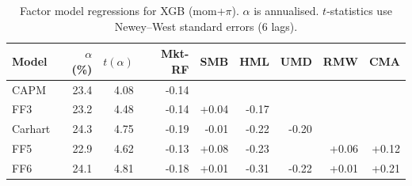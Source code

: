 \begin{table}[H]
\centering
\small
\begin{tabular}{l r r r r r r r r}
\toprule
Model & $\alpha$ (\%) & $t(\alpha)$ & Mkt-RF & SMB & HML & UMD & RMW & CMA \\
\midrule
CAPM & 23.4 & 4.08 & -0.14 &  &  &  &  &  \\
FF3 & 23.2 & 4.48 & -0.14 & +0.04 & -0.17 &  &  &  \\
Carhart & 24.3 & 4.75 & -0.19 & -0.01 & -0.22 & -0.20 &  &  \\
FF5 & 22.9 & 4.62 & -0.13 & +0.08 & -0.23 &  & +0.06 & +0.12 \\
FF6 & 24.1 & 4.81 & -0.18 & +0.01 & -0.31 & -0.22 & +0.01 & +0.21 \\
\bottomrule
\end{tabular}
\caption{Factor model regressions for XGB (mom+$\pi$). $\alpha$ is annualised. $t$-statistics use Newey--West standard errors (6 lags).}
\label{tab:factor_alphas}
\end{table}
